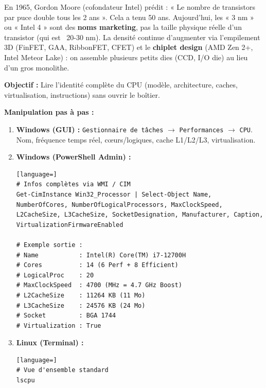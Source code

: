 \documentclass[11pt]{article}
\begin{document}
\begin{savaistu}
En 1965, Gordon Moore (cofondateur Intel) prédit : « Le nombre de transistors par puce double tous les 2 ans ». Cela a tenu 50 ans. Aujourd'hui, les « 3 nm » ou « Intel 4 » sont des \textbf{noms marketing}, pas la taille physique réelle d'un transistor (qui est ~20-30 nm). La densité continue d'augmenter via l'empilement 3D (FinFET, GAA, RibbonFET, CFET) et le \textbf{chiplet design} (AMD Zen 2+, Intel Meteor Lake) : on assemble plusieurs petits dies (CCD, I/O die) au lieu d'un gros monolithe.
\end{savaistu}

\begin{experience}
\textbf{Objectif :} Lire l'identité complète du CPU (modèle, architecture, caches, virtualisation, instructions) sans ouvrir le boîtier.

\textbf{Manipulation pas à pas :}
\begin{enumerate}
    \item \textbf{Windows (GUI) :} \texttt{Gestionnaire de tâches} $\to$ \texttt{Performances} $\to$ \texttt{CPU}. Nom, fréquence temps réel, cœurs/logiques, cache L1/L2/L3, virtualisation.
    \item \textbf{Windows (PowerShell Admin) :}
\begin{lstlisting}[language=]
# Infos complètes via WMI / CIM
Get-CimInstance Win32_Processor | Select-Object Name, NumberOfCores, NumberOfLogicalProcessors, MaxClockSpeed, L2CacheSize, L3CacheSize, SocketDesignation, Manufacturer, Caption, VirtualizationFirmwareEnabled

# Exemple sortie :
# Name           : Intel(R) Core(TM) i7-12700H
# Cores          : 14 (6 Perf + 8 Efficient)
# LogicalProc    : 20
# MaxClockSpeed  : 4700 (MHz = 4.7 GHz Boost)
# L2CacheSize    : 11264 KB (11 Mo)
# L3CacheSize    : 24576 KB (24 Mo)
# Socket         : BGA 1744
# Virtualization : True
\end{lstlisting}
    \item \textbf{Linux (Terminal) :}
\begin{lstlisting}[language=]
# Vue d'ensemble standard
lscpu


\end{lstlisting}
\end{enumerate}
\end{experience}
\end{document}
